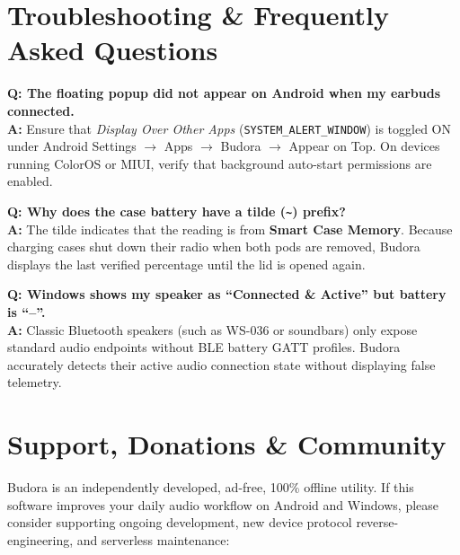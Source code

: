 \documentclass[11pt,a4paper]{article}
\begin{document}
\section{Troubleshooting \& Frequently Asked Questions}

\begin{warnbox}
\textbf{Q: The floating popup did not appear on Android when my earbuds connected.} \\
\textbf{A:} Ensure that \textit{Display Over Other Apps} (\texttt{SYSTEM\_ALERT\_WINDOW}) is toggled ON under Android Settings $\rightarrow$ Apps $\rightarrow$ Budora $\rightarrow$ Appear on Top. On devices running ColorOS or MIUI, verify that background auto-start permissions are enabled.

\vspace{6pt}
\textbf{Q: Why does the case battery have a tilde (\texttt{\~{}}) prefix?} \\
\textbf{A:} The tilde indicates that the reading is from \textbf{Smart Case Memory}. Because charging cases shut down their radio when both pods are removed, Budora displays the last verified percentage until the lid is opened again.

\vspace{6pt}
\textbf{Q: Windows shows my speaker as ``Connected \& Active'' but battery is ``--''.} \\
\textbf{A:} Classic Bluetooth speakers (such as WS-036 or soundbars) only expose standard audio endpoints without BLE battery GATT profiles. Budora accurately detects their active audio connection state without displaying false telemetry.
\end{warnbox}

\section{Support, Donations \& Community}

Budora is an independently developed, ad-free, 100\% offline utility. If this software improves your daily audio workflow on Android and Windows, please consider supporting ongoing development, new device protocol reverse-engineering, and serverless maintenance:
\end{document}
